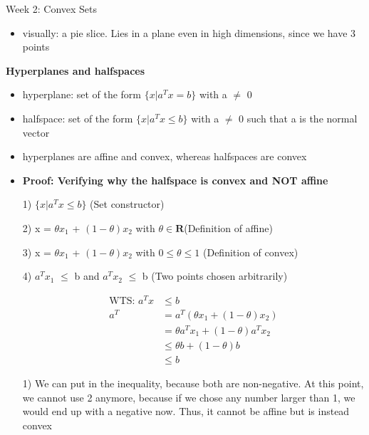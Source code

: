 \documentclass{article}
\begin{document}
\begin{homeworkProblemName}{{\LARGE Week 2: Convex Sets}}
\begin{problemAnswer}
{\begin{itemize}
        \item visually: a pie slice. Lies in a plane even in high dimensions,
          since we have 3 points

      \end{itemize}
    }\end{problemAnswer}

  \vspace{0.2 cm} \textbf{\large Hyperplanes and halfspaces}

  \begin{problemAnswer}{

      \begin{itemize}
        \item hyperplane: set of the form $\{x | a^Tx = b\}$ with a $\neq$ 0
        \item halfspace: set of the form $\{x | a^Tx \leq b\}$ with a $\neq$ 0
          such that a is the normal vector

        \item hyperplanes are affine and convex, whereas halfspaces are convex

        \item \textbf{Proof: Verifying why the halfspace is convex and NOT affine}

          1) $\{x | a^Tx \leq b\}$ (Set constructor)

          2) x = $\theta x_1$ + $(1 - \theta)x_2$ with $\theta \in \bm{R} $(Definition of affine)

          3) x = $\theta x_1$ + $(1 - \theta)x_2$ with $0 \leq \theta \leq 1$ (Definition of convex)

          4) $a^Tx_1$ $\leq$ b and $a^Tx_2$ $\leq$ b (Two points chosen arbitrarily)

          \begin{align*}
            \text{WTS: }a^Tx &\leq b\\
            a^T & = a^T(\theta x_1 + (1 - \theta)x_2) \tag{By definition in 2/3}\\
                             & = \theta a^T x_1 + (1 - \theta) a^T x_2\\
                             &\leq \theta b + (1 - \theta ) b \tag{Explanation 1} \\
                             &\leq b
          \end{align*}

          1) {\small We can put in the inequality, because both are non-negative. At
          this point, we cannot use 2 anymore, because if we chose any number
          larger than 1, we would end up with a negative now. Thus, it cannot be
        affine but is instead convex}


\end{itemize}}
\end{problemAnswer}
\end{homeworkProblemName}
\end{document}
